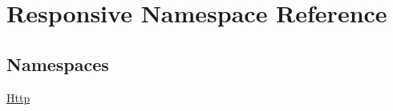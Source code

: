 \hypertarget{namespace_responsive}{}\section{Responsive Namespace Reference}
\label{namespace_responsive}
\subsection*{Namespaces}
\begin{DoxyCompactItemize}
\item 
 \mbox{\hyperlink{namespace_responsive_1_1_http}{Http}}
\end{DoxyCompactItemize}
